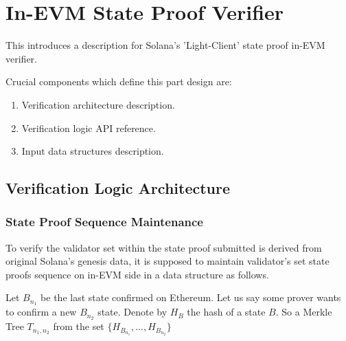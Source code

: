 \chapter{In-EVM State Proof Verifier}

This introduces a description for Solana's 'Light-Client' state proof in-EVM
verifier.

Crucial components which define this part design are:
\begin{enumerate}
    \item Verification architecture description.
    \item Verification logic API reference.
    \item Input data structures description.
\end{enumerate}

\section{Verification Logic Architecture}

\subsection{State Proof Sequence Maintenance}
\label{subsec:stateseq}

To verify the validator set within the state proof submitted is derived from 
original Solana's genesis data, it is supposed to maintain validator's set state
proofs sequence on in-EVM side in a data structure as follows.

Let $B_{n_1}$ be the last state confirmed on Ethereum. Let us say some prover 
wants to confirm a new $B_{n_2}$ state. Denote by $H_{B}$ the hash of a state $B$.
So a Merkle Tree $T_{n_1, n_2}$ from the set $\{H_{B_{n_1}}, ..., H_{B_{n_2}}\}$


